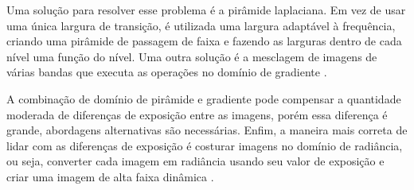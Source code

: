 \documentclass{article}
\begin{document}
Uma solução para resolver esse problema é a pirâmide laplaciana. Em vez de usar uma única largura de transição, é utilizada uma largura adaptável à frequência, criando uma pirâmide de passagem de faixa e fazendo as larguras dentro de cada nível uma função do nível. Uma outra solução é a mesclagem de imagens de várias bandas que executa as operações no domínio de gradiente \cite{szeliski:2010}. 

A combinação de domínio de pirâmide e gradiente pode compensar a quantidade moderada de diferenças de exposição entre as imagens, porém essa diferença é grande, abordagens alternativas são necessárias. Enfim, a maneira mais correta de lidar com as diferenças de  exposição é costurar imagens no domínio de radiância, ou seja, converter cada imagem em radiância usando seu valor de exposição e  criar uma imagem de alta faixa dinâmica \cite{szeliski:2010}.

\small


\end{document}
